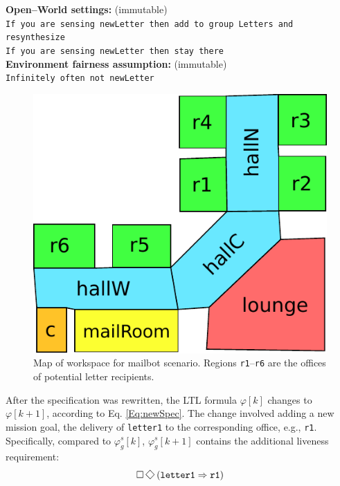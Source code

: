 \begin{algorithm}
{%
	
	
	\textbf{Open--World settings:} (immutable)\\
	\texttt{If you are sensing newLetter then add to group Letters and resynthesize}\\
	\texttt{If you are sensing newLetter then stay there}\\
		
	\textbf{Environment fairness assumption:} (immutable)\\
	\texttt{Infinitely often not newLetter}\\
	}
	\vspace{-10 pt}
\end{algorithm}

\begin{figure}[h]
	\centering
	\includegraphics[width=0.80\columnwidth, clip]{./img/mailbot_map.pdf}
	\caption{Map of workspace for mailbot scenario.  Regions \texttt{r1}--\texttt{r6} are the offices of potential letter recipients.} 
	\label{Fig:map}
\end{figure}

After the specification was rewritten, the LTL formula $\varphi [k]$ changes to $\varphi [k+1]$, according to Eq. \eqref{Eq:newSpec}. The change involved adding a new mission goal, the delivery of \texttt{letter1} to the corresponding office, e.g., \texttt{r1}. Specifically, compared to $\varphi_g^s [k]$, $\varphi_g^s [k+1]$ contains the additional liveness requirement:
\begin{equation*}
	\G\F\left( \texttt{letter1} \Rightarrow \texttt{r1} \right)
\end{equation*}

